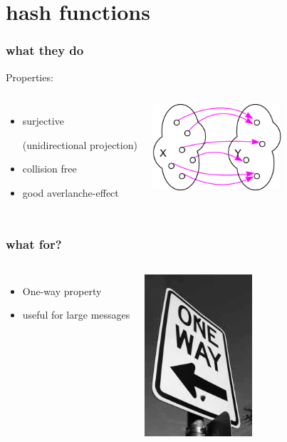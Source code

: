 \section{hash functions}

\begin{frame}
	\frametitle{what they do}
	Properties:
	\begin{columns}
	\column{6cm}
		\begin{itemize}
			\item surjective \begin{small}(unidirectional projection)\end{small}
			\item collision free
			\item good averlanche-effect
		\end{itemize}
	\column{6cm}
		\begin{center}
			\includegraphics[width=4.8cm,height=3.2cm]{surjektiv}
		\end{center}
	\end{columns}
\end{frame}

\begin{frame}
\frametitle{what for?}
	\begin{columns}
	\column{6cm}
		\begin{itemize}
			\item One-way property
			\item useful for large messages
		\end{itemize}
	\column{6cm}
		\begin{center}
			\includegraphics[width=4cm,height=6cm]{oneway}
		\end{center}
	\end{columns}
\end{frame}

